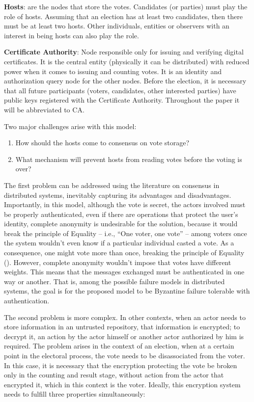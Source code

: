\documentclass[english]{textolivre}
\begin{document}
\textbf{Hosts}: are the nodes that store the votes. Candidates (or parties) must play the role of hosts. Assuming that an election has at least two candidates, then there must be at least two hosts. Other individuals, entities or observers with an interest in being hosts can also play the role.

\textbf{Certificate Authority}: Node responsible only for issuing and verifying digital certificates. It is the central entity (physically it can be distributed) with reduced power when it comes to issuing and counting votes. It is an identity and authorization query node for the other nodes. Before the election, it is necessary that all future participants (voters, candidates, other interested parties) have public keys registered with the Certificate Authority. Throughout the paper it will be abbreviated to CA.

Two major challenges arise with this model:

\begin{enumerate}

\item How should the hosts come to consensus on vote storage?

\item What mechanism will prevent hosts from reading votes before the voting is over?

\end{enumerate}

The first problem can be addressed using the literature on consensus in distributed systems, inevitably capturing its advantages and disadvantages. Importantly, in this model, although the vote is secret, the actors involved must be properly authenticated, even if there are operations that protect the user's identity, complete anonymity is undesirable for the solution, because it would break the principle of Equality – i.e., “One voter, one vote” – among voters once the system wouldn't even know if a particular individual casted a vote. As a consequence, one might vote more than once, breaking the principle of Equality (). However, complete anonymity wouldn't impose that votes have different weights. This means that the messages exchanged must be authenticated in one way or another. That is, among the possible failure models in distributed systems, the goal is for the proposed model to be Byzantine failure tolerable with authentication.

The second problem is more complex. In other contexts, when an actor needs to store information in an untrusted repository, that information is encrypted; to decrypt it, an action by the actor himself or another actor authorized by him is required. The problem arises in the context of an election, when at a certain point in the electoral process, the vote needs to be disassociated from the voter. In this case, it is necessary that the encryption protecting the vote be broken only in the counting and result stage, without action from the actor that encrypted it, which in this context is the voter. Ideally, this encryption system needs to fulfill three properties simultaneously:
\end{document}
